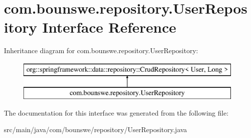\hypertarget{interfacecom_1_1bounswe_1_1repository_1_1_user_repository}{}\section{com.\+bounswe.\+repository.\+User\+Repository Interface Reference}
\label{interfacecom_1_1bounswe_1_1repository_1_1_user_repository}
Inheritance diagram for com.\+bounswe.\+repository.\+User\+Repository\+:\begin{figure}[H]
\begin{center}
\leavevmode
\includegraphics[height=2.000000cm]{interfacecom_1_1bounswe_1_1repository_1_1_user_repository}
\end{center}
\end{figure}


The documentation for this interface was generated from the following file\+:\begin{DoxyCompactItemize}
\item 
src/main/java/com/bounswe/repository/User\+Repository.\+java\end{DoxyCompactItemize}
